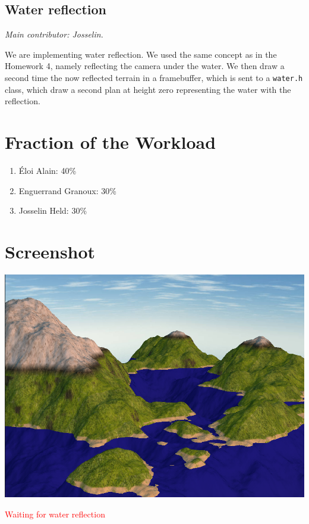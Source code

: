\documentclass[12pt]{article}
\begin{document}
\subsection{Water reflection}

{\it Main contributor: Josselin.}

We are implementing water reflection. We used the same concept as in the Homework 4, namely reflecting the camera under the water. We then draw a second time the now reflected terrain in a framebuffer, which is sent to a \texttt{water.h} class, which draw a second plan at height zero representing the water with the reflection.

\section{Fraction of the Workload}


\begin{enumerate}
\item Éloi Alain: 40\%
\item Enguerrand Granoux: 30\%
\item Josselin Held: 30\%
\end{enumerate}

\section{Screenshot}

\begin{center}
\includegraphics[width=15cm]{view.png}
\end{center}

\textcolor{red}{Waiting for water reflection}



\end{document}

